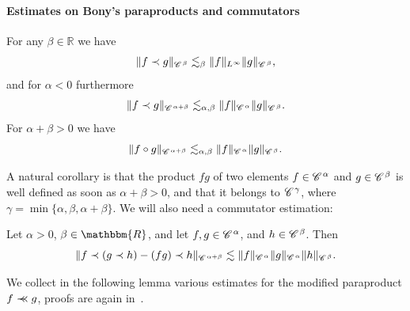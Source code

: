 \begin{appendices}
\paragraph{Estimates on Bony's paraproducts and commutators}

\begin{lemma}
  \label{thm:paraproduct} For any $\beta \in \mathbb{R}$ we have
  \begin{equation}
    \label{eq:para-1} \|f \prec g\|_{\mathscr{C} \hspace{.1em}^{\beta}} \lesssim_{\beta}
    \|f\|_{L^{\infty}} \|g\|_{\mathscr{C} \hspace{.1em}^{\beta}},
  \end{equation}
  and for $\alpha < 0$ furthermore
  \begin{equation}
    \label{eq:para-2} \|f \prec g\|_{\mathscr{C} \hspace{.1em}^{\alpha + \beta}} \lesssim_{\alpha,
    \beta} \|f\|_{\mathscr{C} \hspace{.1em}^{\alpha}} \|g\|_{\mathscr{C} \hspace{.1em}^{\beta}} .
  \end{equation}
  For $\alpha + \beta > 0$ we have
  \begin{equation}
    \label{eq:para-3} \|f \circ g\|_{\mathscr{C} \hspace{.1em}^{\alpha + \beta}} \lesssim_{\alpha,
    \beta} \|f\|_{\mathscr{C} \hspace{.1em}^{\alpha}} \|g\|_{\mathscr{C} \hspace{.1em}^{\beta}} .
  \end{equation}
\end{lemma}

A natural corollary is that the product $fg$ of two elements $f \in
\mathscr{C} \hspace{.1em}^{\alpha}$ and $g \in \mathscr{C} \hspace{.1em}^{\beta}$ is well defined as soon as $\alpha +
\beta > 0$, and that it belongs to $\mathscr{C} \hspace{.1em}^{\gamma}$, where $\gamma = \min
\{\alpha, \beta, \alpha + \beta\}$. We will also need a commutator estimation:

\begin{lemma}
  \label{lem:bony commutator}Let $\alpha > 0$, $\beta \in \mathbbm{R}$, and
  let $f, g \in \mathscr{C} \hspace{.1em}^{\alpha}$, and $h \in \mathscr{C} \hspace{.1em}^{\beta}$. Then
  \[ \| f \prec (g \prec h) - (f g) \prec h \|_{\mathscr{C} \hspace{.1em}^{\alpha + \beta}} \lesssim
     \| f \|_{\mathscr{C} \hspace{.1em}^{\alpha}} \| g \|_{\mathscr{C} \hspace{.1em}^{\alpha}} \| h \|_{\mathscr{C} \hspace{.1em}^{\beta}} . \]
\end{lemma}

We collect in the following lemma various estimates for the modified
paraproduct $f \prec\!\!\!\prec g$, proofs are again in~{\cite{gubinelli_kpz_2017}}.

\begin{lemma}
  {\tmdummy}
  

\end{lemma}
\end{appendices}
